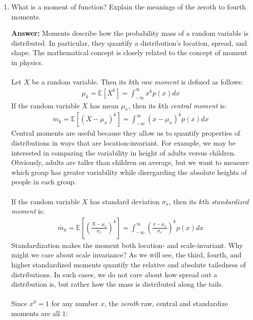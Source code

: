 \documentclass{article}
\newenvironment{QandA}{\begin{enumerate}[label=\arabic*.]}{\end{enumerate}}
\newenvironment{answer}{\par\normalfont \textbf{Answer:}}{}
\newcommand{\Exp}[1]{\mathbb{E}\left[ #1 \right]}
\begin{document}
\begin{QandA}
    \item What is a moment of function? Explain the meanings of the zeroth to fourth moments.
    \begin{answer}
        Moments describe how the probability mass of a random variable is distributed. In particular, they quantify a distribution's location, spread, and shape. The mathematical concept is closely related to the concept of moment in physics.\\\\
        Let $X$ be a random variable. Then its $k$th \textit{raw moment} is defined as follows:
        \begin{align*}
            \mu_k = \Exp{X^k} = \int_{-\infty}^{\infty} x^k p(x)dx
        \end{align*}
        If the random variable $X$ has mean $\mu_x$, then its $k$th \textit{central moment} is:
        \begin{align*}
            m_k = \Exp{(X - \mu_x)^k} = \int_{-\infty}^{\infty} (x-\mu_x)^k p(x) dx
        \end{align*}
        Central moments are useful because they allow us to quantify properties of distributions in ways that are location-invariant. For example, we may be interested in comparing the variability in height of adults versus children. Obviously, adults are taller than children on average, but we want to measure which group has greater variability while disregarding the absolute heights of people in each group.\\\\
        If the random variable $X$ has standard deviation $\sigma_x$, then its $k$th \textit{standardized moment} is:
        \begin{align*}
            \bar{m}_k = \Exp{\left( \frac{X - \mu_x}{\sigma_x} \right)^k} = \int_{-\infty}^{\infty} \left(\frac{x-\mu_x}{\sigma_x}\right)^k p(x) dx
        \end{align*}
        Standardization makes the moment both location- and scale-invariant. Why might we care about scale invariance? As we will see, the third, fourth, and higher standardized moments quantify the relative and absolute tailedness of distributions. In such cases, we do not care about how spread out a distribution is, but rather how the mass is distributed along the tails.\\\\
        Since $x^0 = 1$ for any number $x$, the \emph{zeroth} raw, central and standardize moments are all $1$:
        \begin{align*}

\end{align*}
\end{answer}
\end{QandA}
\end{document}

